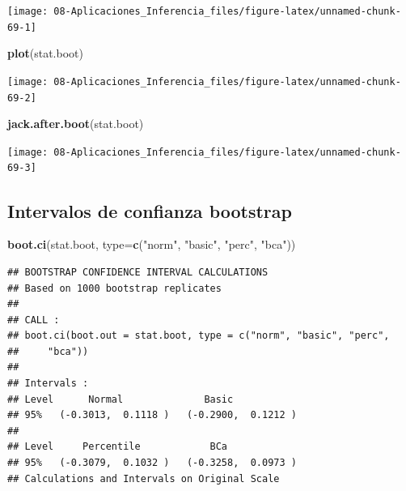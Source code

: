 \documentclass[]{book}
\newenvironment{Shaded}{\begin{snugshade}}{\end{snugshade}}
\newcommand{\KeywordTok}[1]{\textcolor[rgb]{0.13,0.29,0.53}{\textbf{#1}}}
\newcommand{\DataTypeTok}[1]{\textcolor[rgb]{0.13,0.29,0.53}{#1}}
\newcommand{\StringTok}[1]{\textcolor[rgb]{0.31,0.60,0.02}{#1}}
\newcommand{\NormalTok}[1]{#1}
\theoremstyle{definition}
\theoremstyle{definition}
\theoremstyle{definition}
\theoremstyle{remark}
\begin{document}
\begin{center}\texttt{[image: 08-Aplicaciones\_Inferencia\_files/figure-latex/unnamed-chunk-69-1]} \end{center}

\begin{Shaded}
\begin{Highlighting}[]
\KeywordTok{plot}\NormalTok{(stat.boot)}
\end{Highlighting}
\end{Shaded}

\begin{center}\texttt{[image: 08-Aplicaciones\_Inferencia\_files/figure-latex/unnamed-chunk-69-2]} \end{center}

\begin{Shaded}
\begin{Highlighting}[]
\KeywordTok{jack.after.boot}\NormalTok{(stat.boot)}
\end{Highlighting}
\end{Shaded}

\begin{center}\texttt{[image: 08-Aplicaciones\_Inferencia\_files/figure-latex/unnamed-chunk-69-3]} \end{center}

\subsection{Intervalos de confianza
bootstrap}\label{intervalos-de-confianza-bootstrap}

\begin{Shaded}
\begin{Highlighting}[]
\KeywordTok{boot.ci}\NormalTok{(stat.boot, }\DataTypeTok{type=}\KeywordTok{c}\NormalTok{(}\StringTok{"norm"}\NormalTok{, }\StringTok{"basic"}\NormalTok{, }\StringTok{"perc"}\NormalTok{, }\StringTok{"bca"}\NormalTok{))}
\end{Highlighting}
\end{Shaded}

\begin{verbatim}
## BOOTSTRAP CONFIDENCE INTERVAL CALCULATIONS
## Based on 1000 bootstrap replicates
## 
## CALL : 
## boot.ci(boot.out = stat.boot, type = c("norm", "basic", "perc", 
##     "bca"))
## 
## Intervals : 
## Level      Normal              Basic         
## 95%   (-0.3013,  0.1118 )   (-0.2900,  0.1212 )  
## 
## Level     Percentile            BCa          
## 95%   (-0.3079,  0.1032 )   (-0.3258,  0.0973 )  
## Calculations and Intervals on Original Scale
\end{verbatim}
\end{document}
